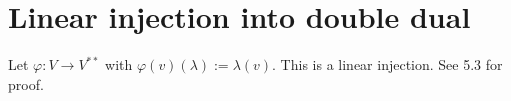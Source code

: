 \section{Linear injection into double dual}
Let $\varphi: V \rightarrow V^{**}$ with $\varphi(v)(\lambda) := \lambda(v)$.
This is a linear injection. See 5.3 for proof.